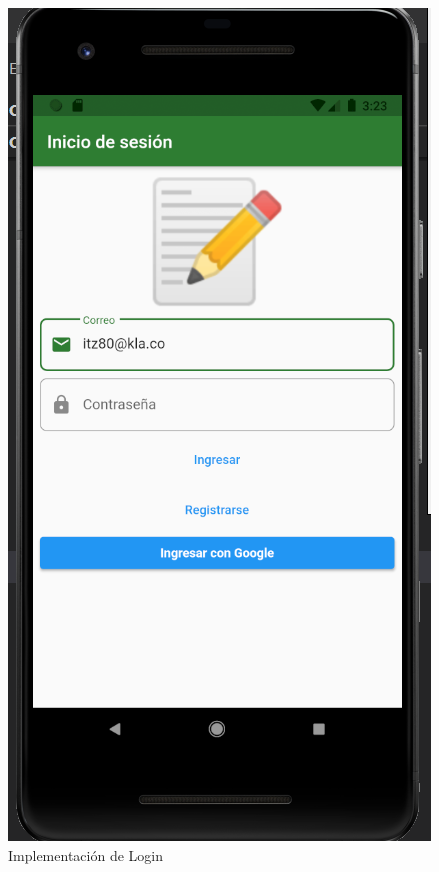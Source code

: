 \documentclass{article}
\begin{document}
\begin{figure}[H]
    \centering
    \includegraphics[scale=0.8]{imgs/Imp/Login1}
    \caption{Implementación de Login}
\end{figure}
\end{document}
